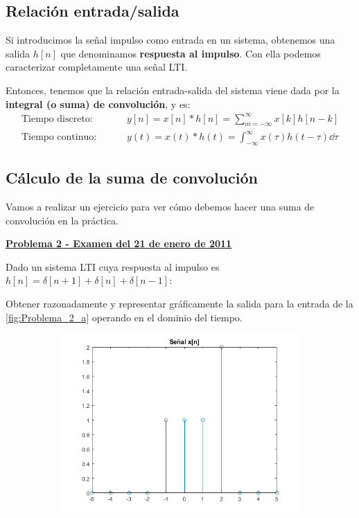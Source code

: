 \documentclass[a4paper]{book}
\begin{document}
\subsection{Relación entrada/salida}

Si introducimos la señal impulso como entrada en un sistema, obtenemos una salida $h[n]$ que denominamos \textbf{respuesta al impulso}. Con ella podemos caracterizar completamente una señal LTI.

Entonces, tenemos que la relación entrada-salida del sistema viene dada por la \textbf{integral (o suma) de convolución}, y es:
\begin{align*}
	\text{Tiempo discreto: } & \qquad \boxed{y[n]=x[n]*h[n]=\sum^{\infty}_{m=-\infty}{x[k]h[n-k]}}                \\
	\text{Tiempo continuo: } & \qquad \boxed{y(t)=x(t)*h(t)=\int^{\infty}_{-\infty}{x(\tau )h(t-\tau )}\dd \tau }
\end{align*}

\subsection{Cálculo de la suma de convolución}
Vamos a realizar un ejercicio para ver cómo debemos hacer una suma de convolución en la práctica.
\vspace{\parskip}

\setlength{\leftskip}{0.5cm}
\setlength{\rightskip}{0.5cm}

\underline{\textbf{Problema 2 - Examen del 21 de enero de 2011}}

Dado un sistema LTI cuya respuesta al impulso es $h[n] = \delta [n+1] + \delta [n] + \delta [n-1]$:

Obtener razonadamente y representar gráficamente la salida para la entrada de la \autoref{fig:Problema_2_a} operando en el dominio del tiempo.

\begin{figure}[!ht]
	\caption{}
	\label{fig:Problema_2_a}
	\centering
	\begin{subfigure}[b]{0.75\linewidth}
		\includegraphics[width=\linewidth]{./Imágenes/aao.png}
	\end{subfigure}


\end{figure}
\end{document}
